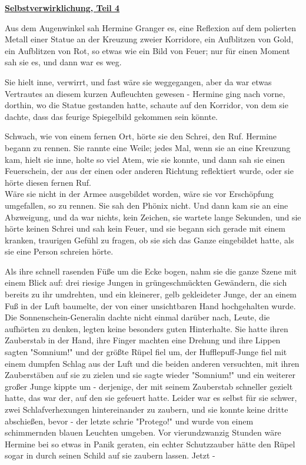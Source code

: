 

\hypertarget{selbstverwirklichung-teil-4}{%

\textbf{\uline{Selbstverwirklichung, Teil 4}}

Aus dem Augenwinkel sah Hermine Granger es, eine Reflexion auf dem polierten Metall einer Statue an der Kreuzung zweier Korridore, ein Aufblitzen von Gold, ein Aufblitzen von Rot, so etwas wie ein Bild von Feuer; nur für einen Moment sah sie es, und dann war es weg.

Sie hielt inne, verwirrt, und fast wäre sie weggegangen, aber da war etwas Vertrautes an diesem kurzen Aufleuchten gewesen - Hermine ging nach vorne, dorthin, wo die Statue gestanden hatte, schaute auf den Korridor, von dem sie dachte, dass das feurige Spiegelbild gekommen sein könnte.

Schwach, wie von einem fernen Ort, hörte sie den Schrei, den Ruf. Hermine begann zu rennen. Sie rannte eine Weile; jedes Mal, wenn sie an eine Kreuzung kam, hielt sie inne, holte so viel Atem, wie sie konnte, und dann sah sie einen Feuerschein, der aus der einen oder anderen Richtung reflektiert wurde, oder sie hörte diesen fernen Ruf.\\ Wäre sie nicht in der Armee ausgebildet worden, wäre sie vor Erschöpfung umgefallen, so zu rennen. Sie sah den Phönix nicht. Und dann kam sie an eine Abzweigung, und da war nichts, kein Zeichen, sie wartete lange Sekunden, und sie hörte keinen Schrei und sah kein Feuer, und sie begann sich gerade mit einem kranken, traurigen Gefühl zu fragen, ob sie sich das Ganze eingebildet hatte, als sie eine Person schreien hörte.

Als ihre schnell rasenden Füße um die Ecke bogen, nahm sie die ganze Szene mit einem Blick auf: drei riesige Jungen in grüngeschmückten Gewändern, die sich bereits zu ihr umdrehten, und ein kleinerer, gelb gekleideter Junge, der an einem Fuß in der Luft baumelte, der von einer unsichtbaren Hand hochgehalten wurde. Die Sonnenschein-Generalin dachte nicht einmal darüber nach, Leute, die aufhörten zu denken, legten keine besonders guten Hinterhalte. Sie hatte ihren Zauberstab in der Hand, ihre Finger machten eine Drehung und ihre Lippen sagten "Somnium!" und der größte Rüpel fiel um, der Hufflepuff-Junge fiel mit einem dumpfen Schlag aus der Luft und die beiden anderen versuchten, mit ihren Zauberstäben auf sie zu zielen und sie sagte wieder "Somnium!" und ein weiterer großer Junge kippte um - derjenige, der mit seinem Zauberstab schneller gezielt hatte, das war der, auf den sie gefeuert hatte. Leider war es selbst für sie schwer, zwei Schlafverhexungen hintereinander zu zaubern, und sie konnte keine dritte abschießen, bevor - der letzte schrie "Protego!" und wurde von einem schimmernden blauen Leuchten umgeben. Vor vierundzwanzig Stunden wäre Hermine bei so etwas in Panik geraten, ein echter Schutzzauber hätte den Rüpel sogar in durch seinen Schild auf sie zaubern lassen. Jetzt -

}
